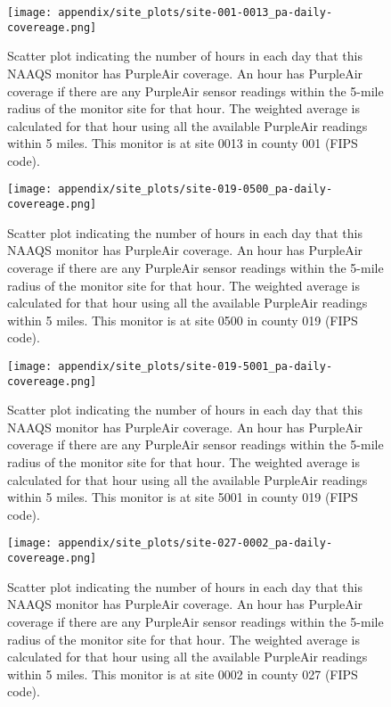 \begin{figure}
\centering
\texttt{[image: appendix/site\_plots/site-001-0013\_pa-daily-covereage.png]}
\caption{Scatter plot indicating the number of hours in each day that this NAAQS monitor has PurpleAir coverage. An hour has PurpleAir coverage if there are any PurpleAir sensor readings within the 5-mile radius of the monitor site for that hour. The weighted average is calculated for that hour using all the available PurpleAir readings within 5 miles. This monitor is at site 0013 in county 001 (FIPS code).}
\label{fig:hourly_coverage_001-0013}
\end{figure}
\begin{figure}
\centering
\texttt{[image: appendix/site\_plots/site-019-0500\_pa-daily-covereage.png]}
\caption{Scatter plot indicating the number of hours in each day that this NAAQS monitor has PurpleAir coverage. An hour has PurpleAir coverage if there are any PurpleAir sensor readings within the 5-mile radius of the monitor site for that hour. The weighted average is calculated for that hour using all the available PurpleAir readings within 5 miles. This monitor is at site 0500 in county 019 (FIPS code).}
\label{fig:hourly_coverage_019-0500}
\end{figure}
\begin{figure}
\centering
\texttt{[image: appendix/site\_plots/site-019-5001\_pa-daily-covereage.png]}
\caption{Scatter plot indicating the number of hours in each day that this NAAQS monitor has PurpleAir coverage. An hour has PurpleAir coverage if there are any PurpleAir sensor readings within the 5-mile radius of the monitor site for that hour. The weighted average is calculated for that hour using all the available PurpleAir readings within 5 miles. This monitor is at site 5001 in county 019 (FIPS code).}
\label{fig:hourly_coverage_019-5001}
\end{figure}
\begin{figure}
\centering
\texttt{[image: appendix/site\_plots/site-027-0002\_pa-daily-covereage.png]}
\caption{Scatter plot indicating the number of hours in each day that this NAAQS monitor has PurpleAir coverage. An hour has PurpleAir coverage if there are any PurpleAir sensor readings within the 5-mile radius of the monitor site for that hour. The weighted average is calculated for that hour using all the available PurpleAir readings within 5 miles. This monitor is at site 0002 in county 027 (FIPS code).}
\label{fig:hourly_coverage_027-0002}
\end{figure}
